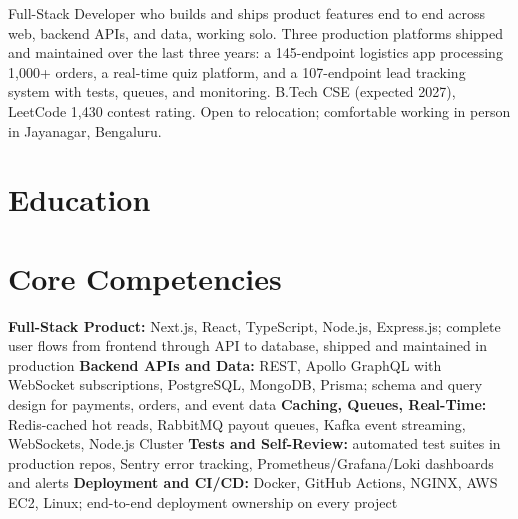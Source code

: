 \documentclass[11pt,a4paper,sans]{moderncv}
\begin{document}
\makecvtitle


\vspace{4pt}
\small{Full-Stack Developer who builds and ships product features end to end across web, backend APIs, and data, working solo. Three production platforms shipped and maintained over the last three years: a 145-endpoint logistics app processing 1,000+ orders, a real-time quiz platform, and a 107-endpoint lead tracking system with tests, queues, and monitoring. B.Tech CSE (expected 2027), LeetCode 1,430 contest rating. Open to relocation; comfortable working in person in Jayanagar, Bengaluru.}


\section{Education}
\vspace{1pt}


\section{Core Competencies}
\vspace{1pt}
\raggedright
\textbf{Full-Stack Product:} Next.js, React, TypeScript, Node.js, Express.js; complete user flows from frontend through API to database, shipped and maintained in production \textbar{}
\textbf{Backend APIs and Data:} REST, Apollo GraphQL with WebSocket subscriptions, PostgreSQL, MongoDB, Prisma; schema and query design for payments, orders, and event data \textbar{}
\textbf{Caching, Queues, Real-Time:} Redis-cached hot reads, RabbitMQ payout queues, Kafka event streaming, WebSockets, Node.js Cluster \textbar{}
\textbf{Tests and Self-Review:} automated test suites in production repos, Sentry error tracking, Prometheus/Grafana/Loki dashboards and alerts \textbar{}
\textbf{Deployment and CI/CD:} Docker, GitHub Actions, NGINX, AWS EC2, Linux; end-to-end deployment ownership on every project
\par\normalfont
\end{document}
